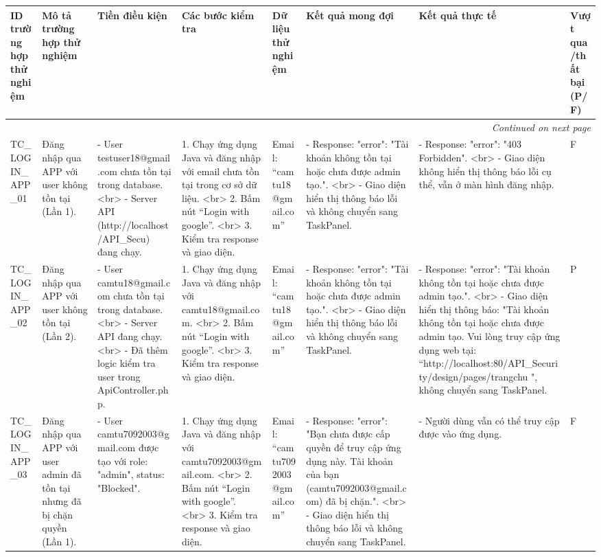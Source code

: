 \documentclass[a4paper,12pt]{article}
\begin{document}
\begin{longtable}{|p{2cm}|p{3cm}|p{3cm}|p{4cm}|p{3cm}|p{3cm}|p{3cm}|p{2cm}|}
    \hline
    \textbf{ID trường hợp thử nghiệm} & \textbf{Mô tả trường hợp thử nghiệm} & \textbf{Tiền điều kiện} & \textbf{Các bước kiểm tra} & \textbf{Dữ liệu thử nghiệm} & \textbf{Kết quả mong đợi} & \textbf{Kết quả thực tế} & \textbf{Vượt qua/thất bại (P/F)} \\ \hline
    \endhead
    \hline
    \multicolumn{8}{|r|}{\textit{Continued on next page}} \\
    \hline
    \endfoot
    \hline
    \endlastfoot
    TC_LOGIN_APP_01 & Đăng nhập qua APP với user không tồn tại (Lần 1). & - User testuser18@gmail.com chưa tồn tại trong database. <br> - Server API (http://localhost/API_Secu) đang chạy. & 1. Chạy ứng dụng Java và đăng nhập với email chưa tồn tại trong cơ sở dữ liệu. <br> 2. Bấm nút “Login with google”. <br> 3. Kiểm tra response và giao diện. & Email: “camtu18@gmail.com” & - Response: {"error": "Tài khoản không tồn tại hoặc chưa được admin tạo."}. <br> - Giao diện hiển thị thông báo lỗi và không chuyển sang TaskPanel. & - Response: {"error": "403 Forbidden"}. <br> - Giao diện không hiển thị thông báo lỗi cụ thể, vẫn ở màn hình đăng nhập. & F \\ \hline
    TC_LOGIN_APP_02 & Đăng nhập qua APP với user không tồn tại (Lần 2). & - User camtu18@gmail.com chưa tồn tại trong database. <br> - Server API đang chạy. <br> - Đã thêm logic kiểm tra user trong ApiController.php. & 1. Chạy ứng dụng Java và đăng nhập với camtu18@gmail.com. <br> 2. Bấm nút “Login with google”. <br> 3. Kiểm tra response và giao diện. & Email: “camtu18@gmail.com” & - Response: {"error": "Tài khoản không tồn tại hoặc chưa được admin tạo."}. <br> - Giao diện hiển thị thông báo lỗi và không chuyển sang TaskPanel. & - Response: {"error": "Tài khoản không tồn tại hoặc chưa được admin tạo."}. <br> - Giao diện hiển thị thông báo: "Tài khoản không tồn tại hoặc chưa được admin tạo. Vui lòng truy cập ứng dụng web tại: “http://localhost:80/API_Security/design/pages/trangchu ", không chuyển sang TaskPanel. & P \\ \hline
    TC_LOGIN_APP_03 & Đăng nhập qua APP với user admin đã tồn tại nhưng đã bị chặn quyền (Lần 1). & - User camtu7092003@gmail.com được tạo với role: "admin", status: "Blocked". & 1. Chạy ứng dụng Java và đăng nhập với camtu7092003@gmail.com. <br> 2. Bấm nút “Login with google”. <br> 3. Kiểm tra response và giao diện. & Email: “camtu7092003@gmail.com” & - Response: {"error": "Bạn chưa được cấp quyền để truy cập ứng dụng này. Tài khoản của bạn (camtu7092003@gmail.com) đã bị chặn."}. <br> - Giao diện hiển thị thông báo lỗi và không chuyển sang TaskPanel. & - Người dùng vẫn có thể truy cập được vào ứng dụng. & F \\ \hline

\end{longtable}
\end{document}
